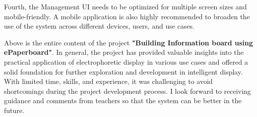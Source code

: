\documentclass[../Main.tex]{subfiles}
\begin{document}
Fourth, the Management UI needs to be optimized for multiple screen sizes and mobile-friendly. A mobile application is also highly recommended to broaden the use of the system across different devices, users, and use cases.

Above is the entire content of the project \textbf{"Building Information board using ePaperboard"}. In general, the project has provided valuable insights into the practical application of electrophoretic display in various use cases and offered a solid foundation for further exploration and development in intelligent display. With limited time, skills, and experience, it was challenging to avoid shortcomings during the project development process. I look forward to receiving guidance and comments from teachers so that the system can be better in the future.
\end{document}
